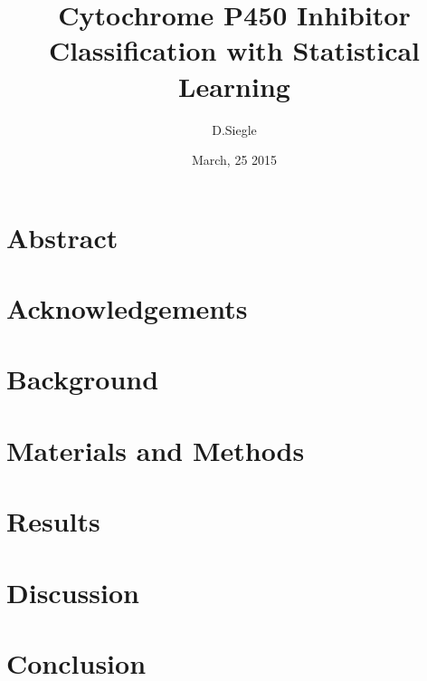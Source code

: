 \documentclass[12pt]{report}
\author{D.Siegle}
\title{Cytochrome P450 Inhibitor Classification with Statistical Learning}
\date{March, 25 2015}
\begin{document}


\chapter*{Abstract}


\tableofcontents
{}
\listoftables
{}
\listoffigures

\begin{doublespacing}

\chapter*{Acknowledgements}



\chapter{Background}



\chapter{Materials and Methods}


\chapter{Results}




\chapter{Discussion}


\chapter{Conclusion}


\end{doublespacing}

{}

\end{document}
